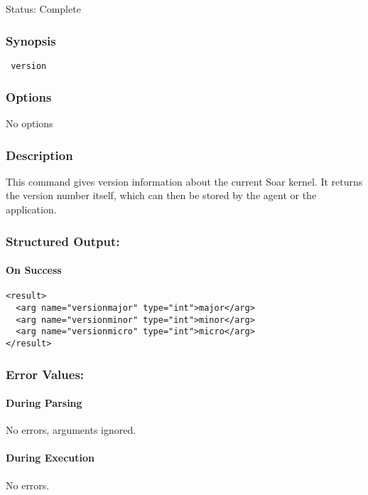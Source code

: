 \subsection{}
\label{version}
 Status: Complete
\subsubsection*{Synopsis}
\begin{verbatim}
 version
\end{verbatim}
\subsubsection*{Options}
 No options 
\subsubsection*{Description}
 This command gives version information about the current Soar kernel. It returns the version number itself, which can then be stored by the agent or the application. 
\subsubsection*{Structured Output:}
\paragraph*{On Success}
\begin{verbatim}
<result>
  <arg name="versionmajor" type="int">major</arg>
  <arg name="versionminor" type="int">minor</arg>
  <arg name="versionmicro" type="int">micro</arg>
</result>
\end{verbatim}
\subsubsection*{Error Values:}
\paragraph*{During Parsing}
 No errors, arguments ignored. 
\paragraph*{During Execution}
 No errors. 
